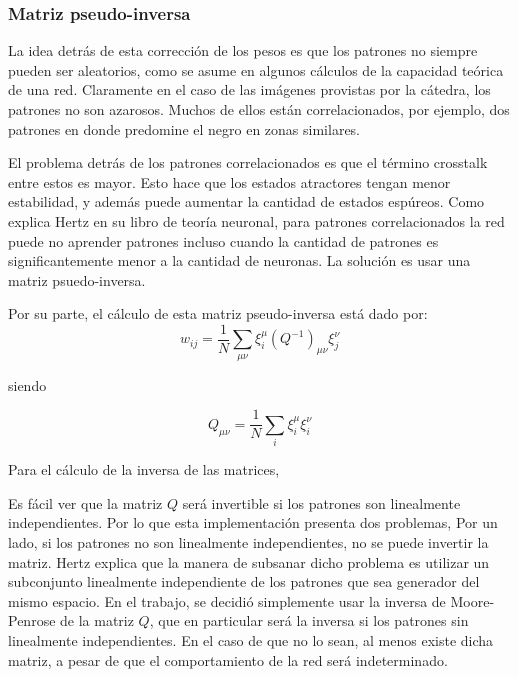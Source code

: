 \documentclass[%
    final,
    reprint,
    notitlepage,
    narroweqnarray,
    inline,
    twoside,
    invited
    ]{ieee}
\begin{document}
\subsubsection{Matriz pseudo-inversa}

\par La idea detrás de esta corrección de los pesos es que los patrones no siempre pueden ser 
aleatorios, como se asume en algunos cálculos de la capacidad teórica de una red. Claramente 
en el caso de las imágenes provistas por la cátedra, los patrones no son azarosos. Muchos de ellos 
están correlacionados, por ejemplo, dos patrones en donde predomine el negro en zonas similares. 
\par El problema detrás de los patrones correlacionados es que el término crosstalk entre estos 
es mayor. Esto hace que los estados atractores tengan menor estabilidad, y además puede aumentar 
la cantidad de estados espúreos. Como explica Hertz en su libro de teoría neuronal, para patrones 
correlacionados la red puede no aprender patrones incluso cuando la cantidad de patrones 
es significantemente menor a la cantidad de neuronas. La solución es usar una 
matriz psuedo-inversa.

\par Por su parte, el cálculo de esta matriz pseudo-inversa está dado por:\\

\begin{equation}
w_{ij}=\frac{1}{N}\sum_{\mu \nu} \xi_i^{\mu}(Q^{-1})_{\mu \nu}  \xi_j^{\nu}
\end{equation}

siendo 

\begin{equation}
Q_{\mu \nu} = \frac{1}{N}\sum_{i}  \xi_i^{\mu}  \xi_i^{\nu}
\end{equation}


\par Para el cálculo de la inversa de las matrices, \\

\par Es fácil ver que la matriz $Q$ será invertible si los patrones son linealmente independientes. 
Por lo que esta implementación presenta dos problemas, Por un lado, si los patrones no son 
linealmente independientes, no se puede invertir la matriz. Hertz explica que la manera de subsanar 
dicho problema es utilizar un subconjunto linealmente independiente de los patrones que sea generador 
del mismo espacio. En el trabajo, se decidió simplemente usar la inversa de Moore-Penrose de la matriz $Q$, 
que en particular será la inversa si los patrones sin linealmente independientes. En el caso de que no lo sean, 
al menos existe dicha matriz, a pesar de que el comportamiento de la red será indeterminado.
\end{document}
